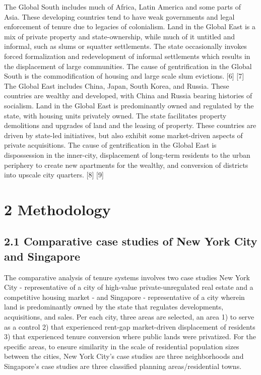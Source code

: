 \documentclass[12pt]{article}
\begin{document}
The Global South includes much of Africa, Latin America and some parts of Asia. These developing countries tend to have weak governments and legal enforcement of tenure due to legacies of colonialism. Land in the Global East is a mix of private property and state-ownership, while much of it untitled and informal, such as slums or squatter settlements. The state occasionally invokes forced formalization and redevelopment of informal settlements which results in the displacement of large communities. The cause of gentrification in the Global South is the commodification of housing and large scale slum evictions. [6] [7] \\ 

The Global East includes China, Japan, South Korea, and Russia. These countries are wealthy and developed, with China and Russia bearing histories of socialism. Land in the Global East is predominantly owned and regulated by the state, with housing units privately owned. The state facilitates property demolitions and upgrades of land and the leasing of property. These countries are driven by state-led initiatives, but also exhibit some market-driven aspects of private acquisitions. The cause of gentrification in the Global East is dispossession in the inner-city, displacement of long-term residents to the urban periphery to create new apartments for the wealthy, and conversion of districts into upscale city quarters. [8] [9] \\

\section*{2 Methodology}
\subsection*{2.1 Comparative case studies of New York City and Singapore} 
The comparative analysis of tenure systems involves two case studies New York City - representative of a city of high-value private-unregulated real estate and a competitive housing market - and Singapore - representative of a city wherein land is predominantly owned by the state that regulates developments, acquisitions, and sales. Per each city, three areas are selected, an area 1) to serve as a control 2) that experienced rent-gap market-driven displacement of residents 3) that experienced tenure conversion where public lands were privatized. For the specific areas, to ensure similarity in the scale of residential population sizes between the cities, New York City’s case studies are three neighborhoods and Singapore’s case studies are three classified planning areas/residential towns. \\
\end{document}
